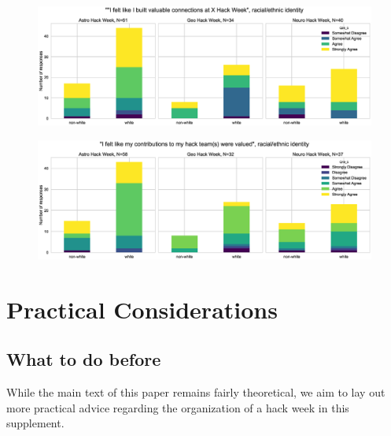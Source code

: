 \documentclass{aastex62}
\begin{document}
\begin{figure}[h!]
\centering
\includegraphics[width=\textwidth]{Q24_5_Q30_stackedbars.eps}
\caption{}
\label{fig:corr11}
\end{figure}

\begin{figure}[h!]
\centering
\includegraphics[width=\textwidth]{Q19_5_Q30_stackedbars.eps}
\caption{}
\label{fig:corr12}
\end{figure}

\clearpage

\section{Practical Considerations}
\subsection{What to do before}

\noindent While the main text of this paper remains fairly theoretical, we aim to lay out more practical advice regarding the organization of a hack week in this supplement.
\end{document}

